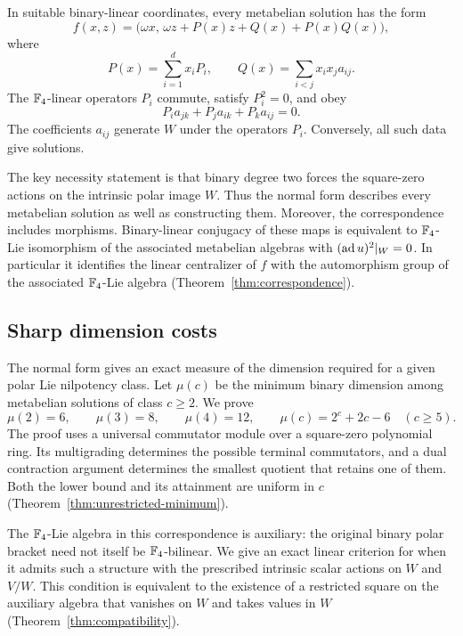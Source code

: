 In suitable binary-linear coordinates, every metabelian solution has the form
\begin{equation}\label{eq:intro-normal}
 f(x,z)=\bigl(\omega x,\,
       \omega z+P(x)z+Q(x)+P(x)Q(x)\bigr),
\end{equation}
where
\[
 P(x)=\sum_{i=1}^d x_iP_i,
 \qquad Q(x)=\sum_{i<j}x_ix_ja_{ij}.
\]
The \(\mathbb F_4\)-linear operators \(P_i\) commute, satisfy \(P_i^2=0\), and obey
\[
 P_i a_{jk}+P_j a_{ik}+P_k a_{ij}=0.
\]
The coefficients \(a_{ij}\) generate \(W\) under the operators \(P_i\).
Conversely, all such data give solutions.

The key necessity statement is that binary degree two forces the
square-zero actions on the intrinsic polar image \(W\). Thus the normal
form describes every metabelian solution as well as constructing them.
Moreover, the correspondence includes morphisms. Binary-linear conjugacy
of these maps is equivalent to \(\mathbb F_4\)-Lie isomorphism of the associated
metabelian algebras with \((\operatorname{ad} u)^2|_{W}=0\).
In particular it identifies the linear centralizer of \(f\) with the
automorphism group of the associated \(\mathbb F_4\)-Lie algebra
(Theorem~\ref{thm:correspondence}).

\subsection{Sharp dimension costs}

The normal form gives an exact measure of the dimension required for a
given polar Lie nilpotency class. Let \(\mu(c)\) be the minimum binary
dimension among metabelian solutions of class \(c\ge2\). We prove
\begin{equation}\label{eq:intro-minimum}
 \mu(2)=6,\qquad\mu(3)=8,\qquad\mu(4)=12,\qquad
 \mu(c)=2^c+2c-6\quad(c\ge5).
\end{equation}
The proof uses a universal commutator module over a square-zero polynomial
ring. Its multigrading determines the possible terminal commutators, and a
dual contraction argument determines the smallest quotient that retains
one of them. Both the lower bound and its attainment are uniform in \(c\)
(Theorem~\ref{thm:unrestricted-minimum}).

The \(\mathbb F_4\)-Lie algebra in this correspondence is auxiliary: the original
binary polar bracket need not itself be \(\mathbb F_4\)-bilinear. We give an exact
linear criterion for when it admits such a structure with the prescribed
intrinsic scalar actions on \(W\) and \(V/W\).
This condition is equivalent to the existence of a restricted square on
the auxiliary algebra that vanishes on \(W\) and takes values in \(W\)
(Theorem~\ref{thm:compatibility}).

